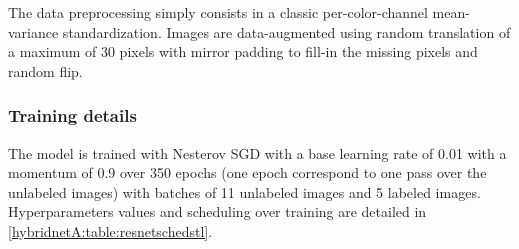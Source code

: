 The data preprocessing simply consists in a classic per-color-channel mean-variance standardization. Images are data-augmented using random translation of a maximum of 30 pixels with mirror padding to fill-in the missing pixels and random flip.

\subsubsection{Training details}

The model is trained with Nesterov SGD with a base learning rate of 0.01 with a momentum of 0.9 over 350 epochs (one epoch correspond to one pass over the unlabeled images) with batches of 11 unlabeled images and 5 labeled images. Hyperparameters values and scheduling over training are detailed in \autoref{hybridnetA:table:resnetschedstl}.




